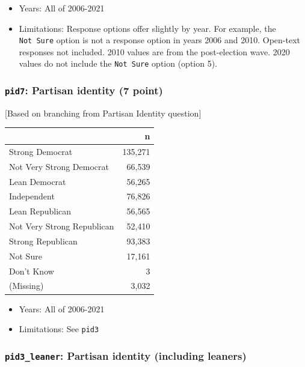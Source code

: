 \documentclass[10pt,article,oneside]{memoir}
\theoremstyle{definition}
\begin{document}
\begin{itemize}
\tightlist
\item
  Years: All of 2006-2021
\item
  Limitations: Response options offer slightly by year. For example, the
  \texttt{Not\ Sure} option is not a response option in years 2006 and
  2010. Open-text responses not included. 2010 values are from the
  post-election wave. 2020 values do not include the \texttt{Not\ Sure}
  option (option 5).
\end{itemize}

\hypertarget{pid7-partisan-identity-7-point}{%
\subsubsection{\texorpdfstring{\texttt{pid7}: Partisan identity (7
point)}{pid7: Partisan identity (7 point)}}\label{pid7-partisan-identity-7-point}}

{[}Based on branching from Partisan Identity question{]}

\begin{table}[H]
\centering
\begin{tabular}[t]{lr}
\toprule
 & n\\
\midrule
Strong Democrat & 135,271\\
Not Very Strong Democrat & 66,539\\
Lean Democrat & 56,265\\
Independent & 76,826\\
Lean Republican & 56,565\\
Not Very Strong Republican & 52,410\\
Strong Republican & 93,383\\
Not Sure & 17,161\\
Don't Know & 3\\
(Missing) & 3,032\\
\bottomrule
\end{tabular}
\end{table}

\begin{itemize}
\tightlist
\item
  Years: All of 2006-2021
\item
  Limitations: See \texttt{pid3}
\end{itemize}

\hypertarget{pid3_leaner-partisan-identity-including-leaners}{%
\subsubsection{\texorpdfstring{\texttt{pid3\_leaner}: Partisan identity
(including
leaners)}{pid3\_leaner: Partisan identity (including leaners)}}\label{pid3_leaner-partisan-identity-including-leaners}}
\end{document}
